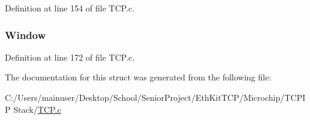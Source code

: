 Definition at line 154 of file T\+C\+P.\+c.

\hypertarget{struct_t_c_p___h_e_a_d_e_r_aa50ec388b8146677414b657d5876103b}{}
\subsubsection[{Window}]{ Window}\label{struct_t_c_p___h_e_a_d_e_r_aa50ec388b8146677414b657d5876103b}


Definition at line 172 of file T\+C\+P.\+c.



The documentation for this struct was generated from the following file\+:\begin{DoxyCompactItemize}
\item 
C\+:/\+Users/mainuser/\+Desktop/\+School/\+Senior\+Project/\+Eth\+Kit\+T\+C\+P/\+Microchip/\+T\+C\+P\+I\+P Stack/\hyperlink{_t_c_p_8c}{T\+C\+P.\+c}\end{DoxyCompactItemize}
